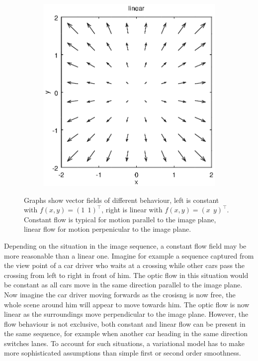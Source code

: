 \documentclass[journal]{vgtc}
\newcommand{\T}{^\top}
\begin{document}
\begin{figure}[htb]
\begin{subfigure}{0.49\linewidth}
\includegraphics[width=\linewidth]{images/linearflow.eps}
\end{subfigure}
\caption{
Graphs show vector fields of different behaviour, left is constant with $f(x,y) = (1\;\, 1)\T$, right is linear with $f(x,y) = (x \;\, y)\T$.
Constant flow is typical for motion parallel to the image plane, linear flow for motion perpenicular to the image plane. 
}
\label{fig:flowfields}
\end{figure}

Depending on the situation in the image sequence, a constant flow field may be more reasonable than a linear one.
Imagine for example a sequence captured from the view point of a car driver who waits at a crossing while other cars pass the crossing from left to right in front of him.
The optic flow in this situation would be constant as all cars move in the same direction parallel to the image plane.
Now imagine the car driver moving forwards as the crosisng is now free, the whole scene around him will appear to move towards him.
The optic flow is now linear as the surroundings move perpendicular to the image plane.
However, the flow behaviour is not exclusive, both constant and linear flow can be present in the same sequence, for example when another car heading in the same direction switches lanes.
To account for such situations, a variational model has to make more sophisticated assumptions than simple first or second order smoothness.
\end{document}
